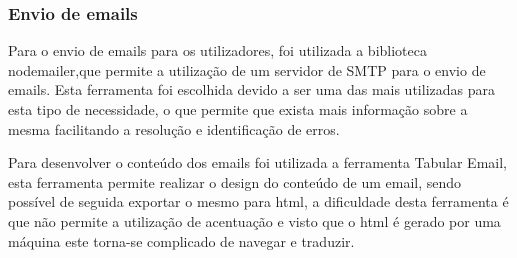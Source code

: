 \subsubsection{Envio de emails}
Para o envio de emails para os utilizadores, foi utilizada a biblioteca nodemailer,que permite a utilização de um servidor de SMTP para o envio de emails. Esta ferramenta foi escolhida devido a ser uma das mais utilizadas para esta tipo de necessidade, o que permite que exista mais informação sobre a mesma facilitando a resolução e identificação de erros. 

Para desenvolver o conteúdo dos emails foi utilizada a ferramenta Tabular Email, esta ferramenta permite realizar o design do conteúdo de um email, sendo possível de seguida exportar o mesmo para html, a dificuldade desta ferramenta é que não permite a utilização de acentuação e visto que o html é gerado por uma máquina este torna-se complicado de navegar e traduzir.
